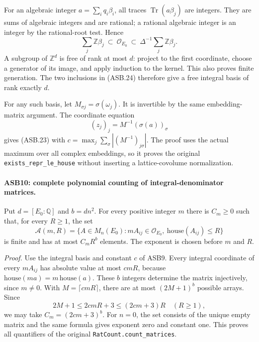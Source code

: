 For an algebraic integer \(a=\sum_iq_i\beta_i\), all traces
\(\operatorname{Tr}(a\beta_j)\) are integers.  They are sums of
algebraic integers and are rational; a rational algebraic integer
is an integer by the rational-root test.  Hence
\[
 \sum_j\mathbb Z\beta_j\ \subset\ \mathcal O_{E_0}\
           \subset\ \Delta^{-1}\sum_j\mathbb Z\beta_j.
 \tag{ASB.24}
\]
A subgroup of \(\mathbb Z^d\) is free of rank at most \(d\):
project to the first coordinate, choose a generator of its image,
and apply induction to the kernel.  This also proves finite
generation.  The two inclusions in (ASB.24) therefore give a
free integral basis of rank exactly \(d\).

For any such basis, let \(M_{\sigma j}=\sigma(\omega_j)\).
It is invertible by the same embedding-matrix argument.
The coordinate equation
\[
             (z_j)_j=M^{-1}(\sigma(a))_\sigma
 \tag{ASB.25}
\]
gives (ASB.23) with
\(c=\max_j\sum_\sigma|(M^{-1})_{j\sigma}|\).
The proof uses the actual maximum over all complex embeddings,
so it proves the original \texttt{exists\_repr\_le\_house}
without inserting a lattice-covolume normalization.

\paragraph{ASB10: complete polynomial counting of integral-denominator matrices.}
\label{claim:ASB10}
Put \(d=[E_0:\mathbb Q]\) and \(b=dn^2\).
For every positive integer \(m\) there is \(C_m\ge0\) such that,
for every \(R\ge1\), the set
\[
 \mathcal A(m,R)=
 \{A\in M_n(E_0):mA_{ij}\in\mathcal O_{E_0},\
                         \mathrm{house}(A_{ij})\le R\}
 \tag{ASB.26}
\]
is finite and has at most \(C_mR^b\) elements.
The exponent is chosen before \(m\) and \(R\).

\emph{Proof.}
Use the integral basis and constant \(c\) of ASB9.
Every integral coordinate of every \(mA_{ij}\) has absolute value
at most \(cmR\), because
\(\mathrm{house}(ma)=m\,\mathrm{house}(a)\).
These \(b\) integers determine the matrix injectively, since
\(m\ne0\).  With \(M=\lceil cmR\rceil\), there are at most
\((2M+1)^b\) possible arrays.  Since
\[
             2M+1\le2cmR+3\le(2cm+3)R\quad(R\ge1),
 \tag{ASB.27}
\]
we may take \(C_m=(2cm+3)^b\).
For \(n=0\), the set consists of the unique empty matrix and
the same formula gives exponent zero and constant one.
This proves all quantifiers of the original
\texttt{RatCount.count\_matrices}.

